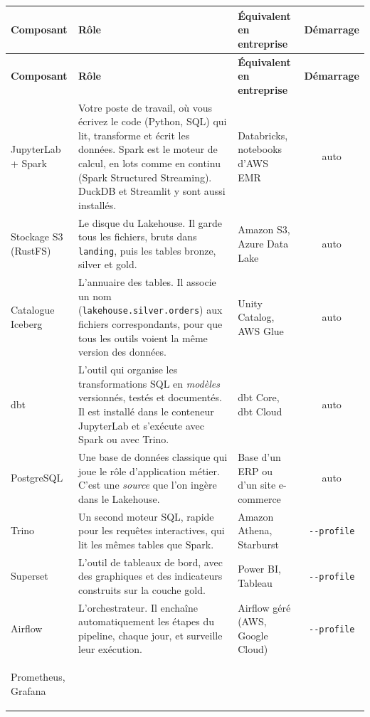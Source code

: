 {\small
\renewcommand{\arraystretch}{1.3}
\begin{xltabular}{\textwidth}{@{}>{\bfseries\raggedright\arraybackslash}p{2.9cm}
  >{\raggedright\arraybackslash}X >{\raggedright\arraybackslash}p{3.2cm} c@{}}
\toprule
\normalfont\textbf{Composant} & \textbf{Rôle} & \textbf{Équivalent en entreprise} & \textbf{Démarrage} \\
\midrule
\endfirsthead
\toprule
\normalfont\textbf{Composant} & \textbf{Rôle} & \textbf{Équivalent en entreprise} & \textbf{Démarrage} \\
\midrule
\endhead
\bottomrule
\endfoot
JupyterLab + Spark &
  Votre poste de travail, où vous écrivez le code (Python, SQL) qui lit, transforme et écrit
  les données. Spark est le moteur de calcul, en lots comme en continu (Spark Structured
  Streaming). DuckDB et Streamlit y sont aussi installés. &
  Databricks, notebooks d'AWS EMR & auto \\
Stockage S3 (RustFS) &
  Le disque du Lakehouse. Il garde tous les fichiers, bruts dans \texttt{landing}, puis
  les tables bronze, silver et gold. &
  Amazon S3, Azure Data Lake & auto \\
Catalogue Iceberg &
  L'annuaire des tables. Il associe un nom (\texttt{lakehouse.silver.orders}) aux fichiers
  correspondants, pour que tous les outils voient la même version des données. &
  Unity Catalog, AWS Glue & auto \\
dbt &
  L'outil qui organise les transformations SQL en \emph{modèles} versionnés, testés et
  documentés. Il est installé dans le conteneur JupyterLab et s'exécute avec Spark ou avec Trino. &
  dbt Core, dbt Cloud & auto \\
PostgreSQL &
  Une base de données classique qui joue le rôle d'application métier. C'est une
  \emph{source} que l'on ingère dans le Lakehouse. &
  Base d'un ERP ou d'un site e-commerce & auto \\
Trino &
  Un second moteur SQL, rapide pour les requêtes interactives, qui lit les mêmes tables
  que Spark. &
  Amazon Athena, Starburst & \texttt{-{}-profile} \\
Superset &
  L'outil de tableaux de bord, avec des graphiques et des indicateurs construits sur la couche gold. &
  Power BI, Tableau & \texttt{-{}-profile} \\
Airflow &
  L'orchestrateur. Il enchaîne automatiquement les étapes du pipeline, chaque jour, et
  surveille leur exécution. &
  Airflow géré (AWS, Google Cloud) & \texttt{-{}-profile} \\
Prometheus, Grafana &

\end{xltabular}}
